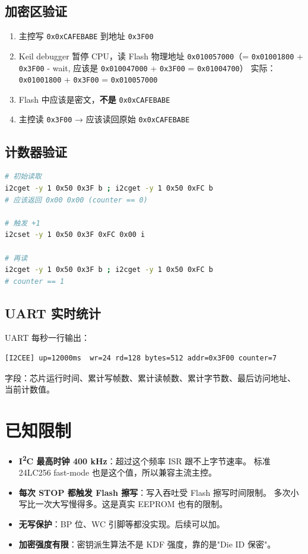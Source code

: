 \documentclass[UTF8,a4paper,11pt]{ctexart}
\newcommand{\hex}[1]{\texttt{0x#1}}
\begin{document}
\subsection{加密区验证}

\begin{enumerate}
    \item 主控写 \hex{0xCAFEBABE} 到地址 \hex{3F00}
    \item Keil debugger 暂停 CPU，读 Flash 物理地址 \hex{010057000}（=
          \hex{01001800} + \hex{3F00} - wait, 应该是 \hex{010047000} + \hex{3F00} = \hex{01004700}）
          实际：\hex{01001800} + \hex{3F00} = \hex{010057000}
    \item Flash 中应该是密文，\textbf{不是} \hex{0xCAFEBABE}
    \item 主控读 \hex{3F00} → 应该读回原始 \hex{0xCAFEBABE}
\end{enumerate}

\subsection{计数器验证}

\begin{lstlisting}[language=bash]
# 初始读取
i2cget -y 1 0x50 0x3F b ; i2cget -y 1 0x50 0xFC b
# 应该返回 0x00 0x00 (counter == 0)

# 触发 +1
i2cset -y 1 0x50 0x3F 0xFC 0x00 i

# 再读
i2cget -y 1 0x50 0x3F b ; i2cget -y 1 0x50 0xFC b
# counter == 1
\end{lstlisting}

\subsection{UART 实时统计}

UART 每秒一行输出：

\begin{lstlisting}
[I2CEE] up=12000ms  wr=24 rd=128 bytes=512 addr=0x3F00 counter=7
\end{lstlisting}

字段：芯片运行时间、累计写帧数、累计读帧数、累计字节数、最后访问地址、
当前计数值。

\section{已知限制}

\begin{itemize}
    \item \textbf{I\textsuperscript{2}C 最高时钟 400 kHz}：超过这个频率 ISR 跟不上字节速率。
          标准 24LC256 fast-mode 也是这个值，所以兼容主流主控。
    \item \textbf{每次 STOP 都触发 Flash 擦写}：写入吞吐受 Flash 擦写时间限制。
          多次小写比一次大写慢得多。这是真实 EEPROM 也有的限制。
    \item \textbf{无写保护}：BP 位、WC 引脚等都没实现。后续可以加。
    \item \textbf{加密强度有限}：密钥派生算法不是 KDF 强度，靠的是"Die ID 保密"。
\end{itemize}
\end{document}
